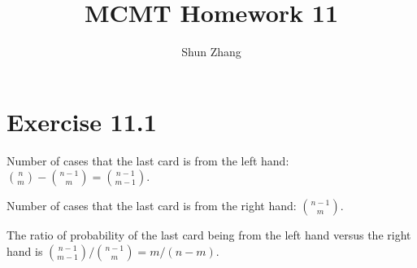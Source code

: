\documentclass[10pt]{article}
\title{MCMT Homework 11}
\author{Shun Zhang}
\date{}
\begin{document}
\maketitle

\section*{Exercise 11.1}
Number of cases that the last card is from the left hand: ${n \choose m} - {n-1
\choose m} = {n-1 \choose m-1}$.

Number of cases that the last card is from the right hand: ${n-1 \choose m}$.

The ratio of probability of the last card being from the left hand versus the
right hand is ${n-1 \choose m-1} / {n-1 \choose m} = m / (n - m)$.
\end{document}

